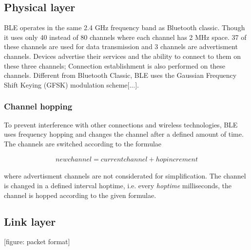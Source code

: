 \documentclass[a4paper]{scrartcl}
\begin{document}
\subsection{Physical layer}

BLE operates in the same 2.4 GHz frequency band as Bluetooth classic. Though it uses only 40 instead of 80 channels where each channel has 2 MHz space. 37 of these channels are used for data transmission and 3 channels are advertisment channels. Devices advertise their services and the ability to connect to them on these three channels; Connection establishment is also performed on these channels. Different from Bluetooth Classic, BLE uses the Gaussian Frequency Shift Keying (GFSK) modulation scheme[...].

\subsubsection{Channel hopping}

To prevent interference with other connections and wireless technologies, BLE uses frequency hopping and changes the channel after a defined amount of time. The channels are switched according to the formulae

\begin{align*}
  newchannel = currentchannel+hopincrement%
\end{align*}

where advertisment channels are not considerated for simplification. The channel is changed in a defined interval hoptime, i.e. every \emph{hoptime} milliseconds, the channel is hopped according to the given formulae.

\subsection{Link layer}

[figure: packet format]
\end{document}
